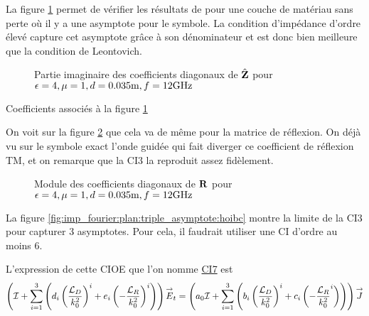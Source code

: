       La figure \ref{fig:imp_fourier:plan:soudais:hoibc} permet de vérifier les résultats de \cite[p.~11]{soudais_3d_2017} pour une couche de matériau sans perte où il y a une asymptote pour le symbole. La condition d'impédance d'ordre élevé capture cet asymptote grâce à son dénominateur et est donc bien meilleure que la condition de Leontovich.
      \begin{figure}[!hbt]
          \centering
          
          \caption[CIOE sur empilement de P.~Soudais p.~11]{Partie imaginaire des coefficients diagonaux de \(\hat{\mathbf{Z}}\) pour \(\epsilon = 4, \mu = 1, d=0.035\text{m}, f=12\text{GHz}\)}
          \label{fig:imp_fourier:plan:soudais:hoibc}
      \end{figure}
      \begin{table}[!hbt]
        \centering
        \caption{Coefficients associés à la figure \ref{fig:imp_fourier:plan:soudais:hoibc}}
        \label{tab:imp_fourier:plan:soudais:hoibc}
      \end{table}

      On voit sur la figure \ref{fig:reflex_fourier:plan:soudais:hoibc} que cela va de même pour la matrice de réflexion. On déjà vu sur le symbole exact l'onde guidée qui fait diverger ce coefficient de réflexion TM, et on remarque que la CI3 la reproduit assez fidèlement.
      \begin{figure}[!hbt]
          \centering
          
          \caption[CIOE sur empilement de P.~Soudais p.~11]{Module des coefficients diagonaux de \(\mathbf{R}\) pour \(\epsilon = 4, \mu = 1, d=0.035\text{m}, f=12\text{GHz}\)}
          \label{fig:reflex_fourier:plan:soudais:hoibc}
      \end{figure}

      La figure \ref{fig:imp_fourier:plan:triple_asymptote:hoibc} montre la limite de la CI3 pour capturer 3 asymptotes. Pour cela, il faudrait utiliser une CI d'ordre au moins 6.

      L'expression de cette CIOE que l'on nomme \hyperlink{ci7}{CI7} est
      \begin{equation}
        \left({\mathcal{I}} + \sum_{i=1}^3 \left(d_{i} \left(\dfrac{{\mathcal{L}_D}}{k_0^2}\right)^i + e_{i} \left(-\dfrac{{\mathcal{L}_R}}{k_0^2}\right)^i \right)\right){\overset{\rightarrow}{E}}_t = \left(a_0 {\mathcal{I}} + \sum_{i=1}^3 \left(b_{i} \left(\dfrac{{\mathcal{L}_D}}{k_0^2}\right)^i + c_{i} \left(-\dfrac{{\mathcal{L}_R}}{k_0^2}^i\right) \right)\right){\overset{\rightarrow}{J}}
      \end{equation}

